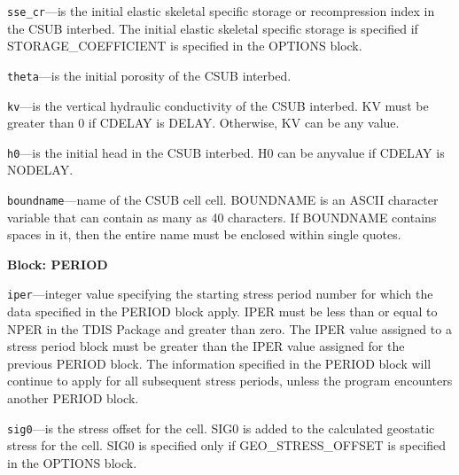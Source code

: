 \begin{description}
\item \texttt{sse\_cr}---is the initial elastic skeletal specific storage or recompression index in the CSUB interbed. The initial elastic skeletal specific storage is specified if STORAGE\_COEFFICIENT is specified in the OPTIONS block.

\item \texttt{theta}---is the initial porosity of the CSUB interbed.

\item \texttt{kv}---is the vertical hydraulic conductivity of the CSUB interbed. KV must be greater than 0 if CDELAY is DELAY. Otherwise, KV can be any value.

\item \texttt{h0}---is the initial head in the CSUB interbed. H0 can be anyvalue if CDELAY is NODELAY.

\item \texttt{boundname}---name of the CSUB cell cell.  BOUNDNAME is an ASCII character variable that can contain as many as 40 characters.  If BOUNDNAME contains spaces in it, then the entire name must be enclosed within single quotes.

\end{description}
\item \textbf{Block: PERIOD}

\begin{description}
\item \texttt{iper}---integer value specifying the starting stress period number for which the data specified in the PERIOD block apply.  IPER must be less than or equal to NPER in the TDIS Package and greater than zero.  The IPER value assigned to a stress period block must be greater than the IPER value assigned for the previous PERIOD block.  The information specified in the PERIOD block will continue to apply for all subsequent stress periods, unless the program encounters another PERIOD block.

\item \texttt{sig0}---is the stress offset for the cell. SIG0 is added to the calculated geostatic stress for the cell. SIG0 is specified only if GEO\_STRESS\_OFFSET is specified in the OPTIONS block.

\end{description}

